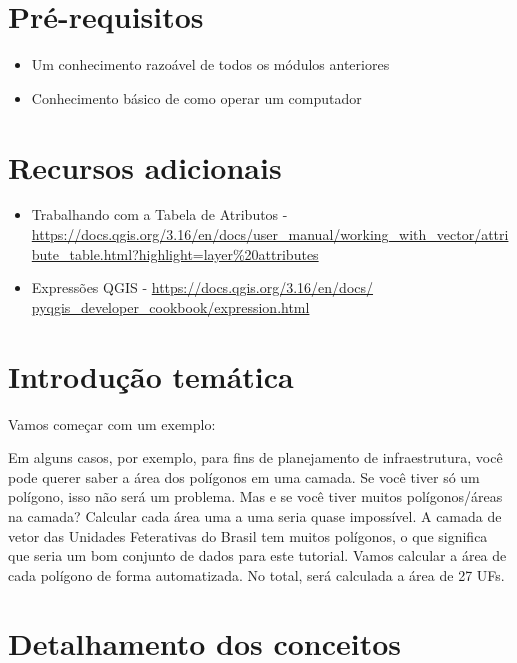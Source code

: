 \documentclass[
]{book}
\providecommand{\tightlist}{%
  \setlength{\itemsep}{0pt}\setlength{\parskip}{0pt}}
\begin{document}
\hypertarget{pruxe9-requisitos-6}{%
\section{Pré-requisitos}\label{pruxe9-requisitos-6}}

\begin{itemize}
\tightlist
\item
  Um conhecimento razoável de todos os módulos anteriores
\item
  Conhecimento básico de como operar um computador
\end{itemize}

\hypertarget{recursos-adicionais-6}{%
\section{Recursos adicionais}\label{recursos-adicionais-6}}

\begin{itemize}
\tightlist
\item
  Trabalhando com a Tabela de Atributos - \url{https://docs.qgis.org/3.16/en/docs/user_manual/working_with_vector/attribute_table.html?highlight=layer\%20attributes}
\item
  Expressões QGIS - \href{https://docs.qgis.org/3.16/en/docs/pyqgis_developer_cookbook/expressions.html}{https://docs.qgis.org/3.16/en/docs/ pyqgis\_developer\_cookbook/expression.html}
\end{itemize}

\hypertarget{introduuxe7uxe3o-temuxe1tica-6}{%
\section{Introdução temática}\label{introduuxe7uxe3o-temuxe1tica-6}}

Vamos começar com um exemplo:

Em alguns casos, por exemplo, para fins de planejamento de infraestrutura, você pode querer saber a área dos polígonos em uma camada. Se você tiver só um polígono, isso não será um problema. Mas e se você tiver muitos polígonos/áreas na camada? Calcular cada área uma a uma seria quase impossível. A camada de vetor das Unidades Feterativas do Brasil tem muitos polígonos, o que significa que seria um bom conjunto de dados para este tutorial. Vamos calcular a área de cada polígono de forma automatizada. No total, será calculada a área de 27 UFs.

\hypertarget{detalhamento-dos-conceitos-3}{%
\section{Detalhamento dos conceitos}\label{detalhamento-dos-conceitos-3}}
\end{document}
